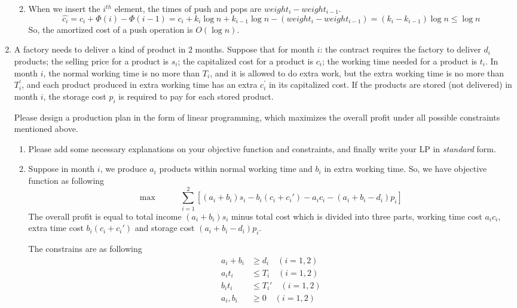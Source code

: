 \documentclass[12pt,a4paper]{article}
\makeatletter
\newtheorem*{solution}{Solution}
\theoremstyle{definition}
\renewenvironment{solution}[1][Solution] {\par\pushQED{\qed}\normalfont\topsep6\p@\@plus6\p@\relax\trivlist\item[\hskip\labelsep\bfseries#1\@addpunct{.}]\ignorespaces}{\popQED\endtrivlist\@endpefalse} \makeatother
\makeatother
\begin{document}
\begin{enumerate}
\begin{enumerate}
\begin{solution}
        	When we insert the $i^{th}$ element, the times of push and pops are $weight_i-weight_{i-1}$. 
        	$$
        	\hat{c_i} = c_i+\Phi(i)-\Phi(i-1)=c_i+k_i\log n+k_{i-1}\log n-(weight_i-weight_{i-1}) = (k_i-k_{i-1})\log n\leq\log n
        	$$
        	So, the amortized cost of a push operation is $O(\log n)$.
        \end{solution}
    \end{enumerate}

\item A factory needs to deliver a kind of product in $2$ months. Suppose that for month $i$: the contract requires the factory to deliver $d_i$ products; the selling price for a product is $s_{i}$; the capitalized cost for a product is $c_{i}$; the working time needed for a product is $t_{i}$. In month $i$, the normal working time is no more than $T_{i}$, and it is allowed to do extra work, but the extra working time is no more than $T_{i}^{\prime}$, and each product produced in extra working time has an extra $c_{i}^{\prime}$ in its capitalized cost. If the products are stored (not delivered) in month $i$, the storage cost $p_i$ is required to pay for each stored product.

Please design a production plan in the form of linear programming, which maximizes the overall profit under all possible constraints mentioned above.

\begin{enumerate}
\item  Please add some necessary explanations on your objective function and constraints, and finally write your LP in \emph{standard} form.

\begin{solution} Suppose in month $i$, we produce $a_i$ products within normal working time and $b_i$ in extra working time. So, we have objective function as following
	$$
	\text{max}\quad\quad\quad\sum_{i=1}^{2}\left[(a_i+b_i)s_i - b_i(c_i+c_i') - a_ic_i - (a_i+b_i-d_i)p_i\right]
	$$
	The overall profit is equal to total income $(a_i+b_i)s_i$ minus total cost which is divided into three parts, working time cost $a_ic_i$, extra time cost $b_i(c_i+c_i')$ and storage cost $(a_i+b_i-d_i)p_i$.
	
	The constrains are as following
	\begin{equation}
	\begin{aligned}
	a_i+b_i&\geq d_i\quad(i=1,2)\\
	a_it_i &\leq T_i\quad(i=1,2)\\
	b_it_i &\leq T_i'\quad(i=1,2)\\
	a_i,b_i&\geq 0\quad(i=1,2)\\	
	\end{aligned}\nonumber
	\end{equation}
	

\end{solution}
\end{enumerate}
\end{enumerate}
\end{document}
